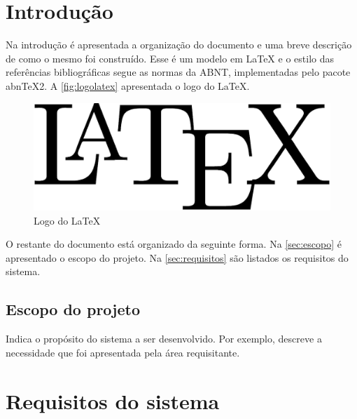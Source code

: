 \documentclass[11pt]{article}
\begin{document}
\clearpage
\pagestyle{plain}


\tableofcontents
\clearpage





\section{Introdução}
\label{sec:introducao}

Na introdução é apresentada a organização do documento e uma breve descrição de como o mesmo foi construído.   Esse é um modelo em \LaTeX \cite{lamport94} e o estilo das referências bibliográficas segue as normas da ABNT, implementadas pelo pacote abnTeX2. A \autoref{fig:logolatex} apresentada o logo do \LaTeX.

\begin{figure}[ht]
    \centering
    \includegraphics[width=.5\linewidth]{figuras/latex-logo}
    \caption{Logo do \LaTeX}
    \label{fig:logolatex}
\end{figure}

\lipsum[1]

O restante do documento está organizado da seguinte forma. Na \autoref{sec:escopo} é apresentado o escopo do projeto. Na \autoref{sec:requisitos} são listados os requisitos do sistema.

\subsection{Escopo do projeto}
\label{sec:escopo}

Indica o propósito do sistema a ser desenvolvido. Por exemplo, descreve a necessidade que foi apresentada pela área requisitante. \lipsum[2]


\section{Requisitos do sistema}
\label{sec:requisitos}
\end{document}
